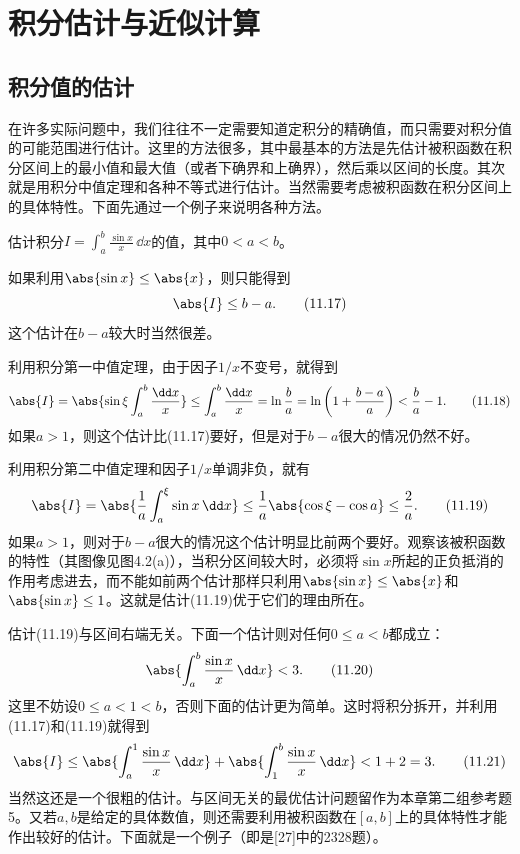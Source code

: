 \section{积分估计与近似计算}

\subsection{积分值的估计}

在许多实际问题中，我们往往不一定需要知道定积分的精确值，而只需要对积分值的可能范围进行估计。这里的方法很多，其中最基本的方法是先估计被积函数在积分区间上的最小值和最大值（或者下确界和上确界），然后乘以区间的长度。其次就是用积分中值定理和各种不等式进行估计。当然需要考虑被积函数在积分区间上的具体特性。下面先通过一个例子来说明各种方法。

\begin{xexample}[11.3.1]
估计积分$I=\int_a^b\frac{\sin x}{x}\,\dd x$的值，其中$0<a<b$。
\end{xexample}
\begin{xsolution}
如果利用$\abs{\sin x}\le\abs{x}$，则只能得到
\begin{equation}
  \abs{I}\le b-a.
  \tag{11.17}
  \label{eq:11.17}
\end{equation}
这个估计在$b-a$较大时当然很差。

利用积分第一中值定理，由于因子$1/x$不变号，就得到
\begin{equation}
  \abs{I}=\abs{\sin\xi\int_a^b\frac{\dd x}{x}}
  \le\int_a^b\frac{\dd x}{x}=\ln\frac ba
  =\ln\left(1+\frac{b-a}{a}\right)<\frac ba-1.
  \tag{11.18}
  \label{eq:11.18}
\end{equation}
如果$a>1$，则这个估计比(11.17)要好，但是对于$b-a$很大的情况仍然不好。

利用积分第二中值定理和因子$1/x$单调非负，就有
\begin{equation}
  \abs{I}=\abs{\frac1a\int_a^\xi\sin x\,\dd x}
  \le\frac1a\abs{\cos\xi-\cos a}\le\frac2a.
  \tag{11.19}
  \label{eq:11.19}
\end{equation}
如果$a>1$，则对于$b-a$很大的情况这个估计明显比前两个要好。观察该被积函数的特性（其图像见图4.2(a)），当积分区间较大时，必须将$\sin x$所起的正负抵消的作用考虑进去，而不能如前两个估计那样只利用$\abs{\sin x}\le\abs{x}$和$\abs{\sin x}\le1$。这就是估计(11.19)优于它们的理由所在。

估计(11.19)与区间右端无关。下面一个估计则对任何$0\le a<b$都成立：
\begin{equation}
  \abs{\int_a^b\frac{\sin x}{x}\,\dd x}<3.
  \tag{11.20}
  \label{eq:11.20}
\end{equation}
这里不妨设$0\le a<1<b$，否则下面的估计更为简单。这时将积分拆开，并利用(11.17)和(11.19)就得到
\begin{equation}
  \abs{I}\le\abs{\int_a^1\frac{\sin x}{x}\,\dd x}
  +\abs{\int_1^b\frac{\sin x}{x}\,\dd x}<1+2=3.
  \tag{11.21}
  \label{eq:11.21}
\end{equation}
当然这还是一个很粗的估计。与区间无关的最优估计问题留作为本章第二组参考题5。又若$a,b$是给定的具体数值，则还需要利用被积函数在$[a,b]$上的具体特性才能作出较好的估计。下面就是一个例子（即是[27]中的2328题）。
\end{xsolution}

